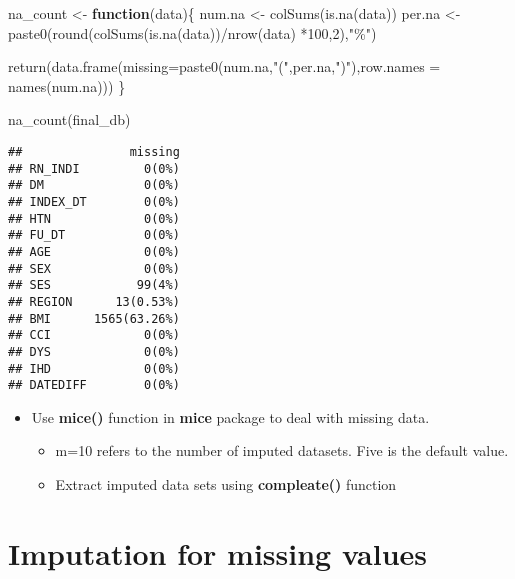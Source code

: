 \documentclass[
]{book}
\newenvironment{Shaded}{\begin{snugshade}}{\end{snugshade}}
\newcommand{\AttributeTok}[1]{\textcolor[rgb]{0.77,0.63,0.00}{#1}}
\newcommand{\ControlFlowTok}[1]{\textcolor[rgb]{0.13,0.29,0.53}{\textbf{#1}}}
\newcommand{\DecValTok}[1]{\textcolor[rgb]{0.00,0.00,0.81}{#1}}
\newcommand{\FunctionTok}[1]{\textcolor[rgb]{0.00,0.00,0.00}{#1}}
\newcommand{\NormalTok}[1]{#1}
\newcommand{\OtherTok}[1]{\textcolor[rgb]{0.56,0.35,0.01}{#1}}
\newcommand{\SpecialCharTok}[1]{\textcolor[rgb]{0.00,0.00,0.00}{#1}}
\newcommand{\StringTok}[1]{\textcolor[rgb]{0.31,0.60,0.02}{#1}}
\providecommand{\tightlist}{%
  \setlength{\itemsep}{0pt}\setlength{\parskip}{0pt}}
\begin{document}
\begin{Shaded}
\begin{Highlighting}[]
\NormalTok{na\_count }\OtherTok{\textless{}{-}} \ControlFlowTok{function}\NormalTok{(data)\{}
\NormalTok{  num.na }\OtherTok{\textless{}{-}} \FunctionTok{colSums}\NormalTok{(}\FunctionTok{is.na}\NormalTok{(data))}
\NormalTok{  per.na }\OtherTok{\textless{}{-}} \FunctionTok{paste0}\NormalTok{(}\FunctionTok{round}\NormalTok{(}\FunctionTok{colSums}\NormalTok{(}\FunctionTok{is.na}\NormalTok{(data))}\SpecialCharTok{/}\FunctionTok{nrow}\NormalTok{(data) }\SpecialCharTok{*}\DecValTok{100}\NormalTok{,}\DecValTok{2}\NormalTok{),}\StringTok{"\%"}\NormalTok{)}
  
  \FunctionTok{return}\NormalTok{(}\FunctionTok{data.frame}\NormalTok{(}\AttributeTok{missing=}\FunctionTok{paste0}\NormalTok{(num.na,}\StringTok{"("}\NormalTok{,per.na,}\StringTok{")"}\NormalTok{),}\AttributeTok{row.names =} \FunctionTok{names}\NormalTok{(num.na)))}
\NormalTok{\}}

\FunctionTok{na\_count}\NormalTok{(final\_db)}
\end{Highlighting}
\end{Shaded}

\begin{verbatim}
##               missing
## RN_INDI         0(0%)
## DM              0(0%)
## INDEX_DT        0(0%)
## HTN             0(0%)
## FU_DT           0(0%)
## AGE             0(0%)
## SEX             0(0%)
## SES            99(4%)
## REGION      13(0.53%)
## BMI      1565(63.26%)
## CCI             0(0%)
## DYS             0(0%)
## IHD             0(0%)
## DATEDIFF        0(0%)
\end{verbatim}

\begin{itemize}
\tightlist
\item
  Use \textbf{mice()} function in \textbf{mice} package to deal with missing data.

  \begin{itemize}
  \tightlist
  \item
    m=10 refers to the number of imputed datasets. Five is the default value.
  \item
    Extract imputed data sets using \textbf{compleate()} function
  \end{itemize}
\end{itemize}

\hypertarget{imputation-for-missing-values}{%
\section{Imputation for missing values}\label{imputation-for-missing-values}}
\end{document}
